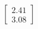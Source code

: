 \documentclass[preview]{standalone}
\begin{document}
\begin{align*}
\begin{bmatrix} 2.41 \\ 3.08 \end{bmatrix}
\end{align*}
\end{document}
